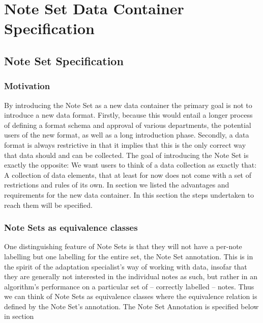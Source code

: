 \chapter{Note Set Data Container Specification}
\label{chap:technicaldocu}

\section{Note Set Specification}
\subsection{Motivation}
By introducing the Note Set as a new data container the primary goal is not to introduce a new data format. Firstly, because this would entail a longer process of defining a format schema and approval of various departments, the potential users of the new format, as well as a long introduction phase. Secondly, a data format is always restrictive in that it implies that this is the only correct way that data should and can be collected. The goal of introducing the Note Set is exactly the opposite: We want users to think of a data collection as exactly that: A collection of data elements, that at least for now does not come with a set of restrictions and rules of its own. In section  we listed the advantages and requirements for the new data container. In this section the steps undertaken to reach them will be specified.
\subsection{Note Sets as equivalence classes}
One distinguishing feature of Note Sets is that they will not have a per-note labelling but one labelling for the entire set, the Note Set annotation. This is in the spirit of the adaptation specialist's way of working with data, insofar that they are generally not interested in the individual notes as such, but rather in an algorithm's performance on a particular set of -- correctly labelled -- notes. Thus we can think of Note Sets as equivalence classes where the equivalence relation is defined by the Note Set's annotation. The Note Set Annotation is specified below in section 
